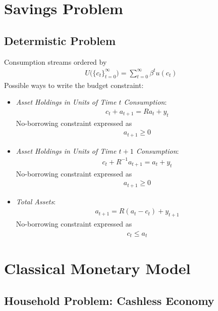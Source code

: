 \documentclass[12pt]{article}
\theoremstyle{plain}
\theoremstyle{definition}
\theoremstyle{remark}
\newcommand{\sumtinfz}{\sum^\infty_{t=0}}
\newcommand{\tinfz}{^\infty_{t=0}}
\begin{document}
\clearpage
\section{Savings Problem}

\subsection{Determistic Problem}

Consumption streams ordered by
\begin{align*}
  U\big(\{c_t\}\tinfz\big)
  = \sumtinfz \beta^tu(c_t)
\end{align*}
Possible ways to write the budget constraint:
\begin{itemize}
  \item
    \emph{Asset Holdings in Units of Time $t$ Consumption}:
    \begin{align*}
      c_t + a_{t+1} = Ra_t + y_t
    \end{align*}
    No-borrowing constraint expressed as
    \begin{align*}
      a_{t+1} \geq 0
    \end{align*}

  \item
    \emph{Asset Holdings in Units of Time $t+1$ Consumption}:
    \begin{align*}
      c_t + R^{-1}a_{t+1} = a_t + y_t
    \end{align*}
    No-borrowing constraint expressed as
    \begin{align*}
      a_{t+1} \geq 0
    \end{align*}

  \item \emph{Total Assets}:
    \begin{align*}
      a_{t+1} = R(a_t-c_t) + y_{t+1}
    \end{align*}
    No-borrowing constraint expressed as
    \begin{align*}
      c_t \leq a_t
    \end{align*}


\end{itemize}

\clearpage
\section{Classical Monetary Model}

\subsection{Household Problem: Cashless Economy}
\label{sec:singlegood}
\end{document}
